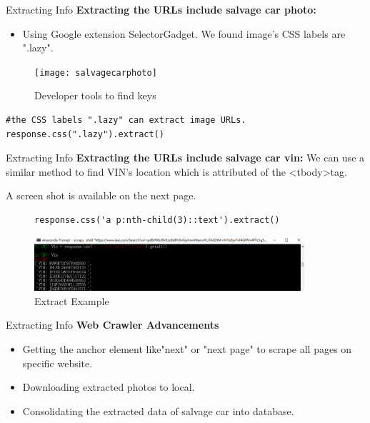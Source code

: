 \documentclass{beamer}
\begin{document}
\begin{frame}[fragile=singleslide]{Extracting Info}
\textbf{Extracting the URLs include salvage car photo:}
\begin{itemize}
    \item Using Google extension SelectorGadget. We found image's CSS labels are ".lazy".
\end{itemize}
\begin{figure}[ht]
\centering
\texttt{[image: salvagecarphoto]}
\caption{Developer tools to find keys}
\label{fig:salvage}
\end{figure}
\begin{verbatim}
#the CSS labels ".lazy" can extract image URLs. 
response.css(".lazy").extract()
\end{verbatim}
\end{frame}

\begin{frame}[fragile=singleslide]{Extracting Info}
\textbf{Extracting the URLs include salvage car vin:}
We can use a similar method to find VIN's location which is attributed of the  \textless tbody\textgreater  tag.

A screen shot is available on the next page.

\begin{figure}[ht]
\begin{itemize}
\begin{verbatim}
response.css('a p:nth-child(3)::text').extract()
\end{verbatim}
\end{itemize}
\centering
\includegraphics[width=100mm]{vinscrape}
\caption{Extract Example}
\end{figure}


\end{frame}

\begin{frame}[fragile=singleslide]{Extracting Info}
\textbf{Web Crawler Advancements}
\begin{itemize}
    \setlength\itemsep{2em}
    \item Getting the anchor element like"next" or "next page" to scrape all pages on specific website.
    \item Downloading extracted photos to local.
    \item Consolidating the extracted data of salvage car into database.
\end{itemize}
\begin{figure}[ht]

\label{fig:salvage2}
\end{figure}

\end{frame}
\end{document}
